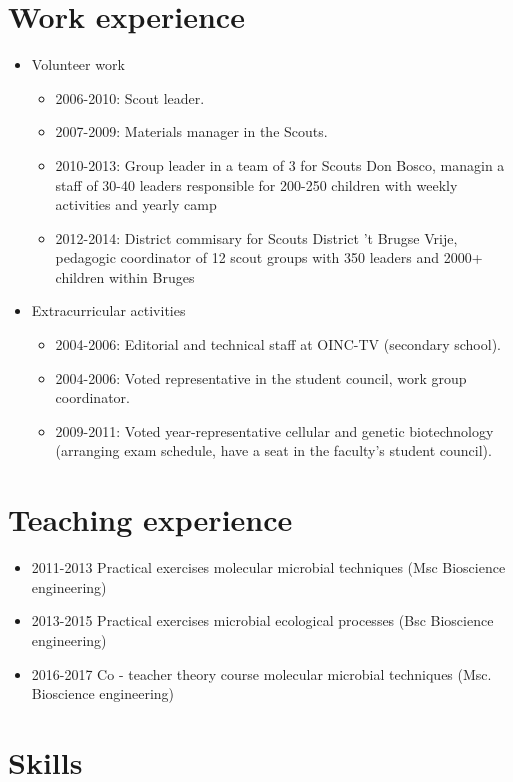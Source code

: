 \documentclass[a4paper,11pt,oneside]{article}
\begin{document}
\section*{Work experience}
\begin{itemize}
\item Volunteer work
	\begin{itemize}
	\item 2006-2010: Scout leader.
	\item 2007-2009: Materials manager in the Scouts.
  \item 2010-2013: Group leader in a team of 3 for Scouts Don Bosco, managin a staff of 30-40 leaders responsible for 200-250 children with weekly activities and yearly camp
  \item 2012-2014: District commisary for Scouts District 't Brugse Vrije, pedagogic coordinator of 12 scout groups with 350 leaders and 2000+ children within Bruges
	\end{itemize}
\item Extracurricular activities
	\begin{itemize}
	\item 2004-2006: Editorial and technical staff at OINC-TV (secondary school). 
	\item 2004-2006: Voted representative in the student council, work group coordinator.
	\item 2009-2011: Voted year-representative cellular and genetic biotechnology (arranging exam schedule, have a seat in the faculty's student council).
	\end{itemize}
\end{itemize}

\section*{Teaching experience}
\begin{itemize}
  \item 2011-2013 Practical exercises molecular microbial techniques (Msc Bioscience engineering)
  \item 2013-2015 Practical exercises microbial ecological processes (Bsc Bioscience engineering)
  \item 2016-2017 Co - teacher theory course molecular microbial techniques (Msc. Bioscience engineering) 
\end{itemize}

\section*{Skills}
\end{document}
